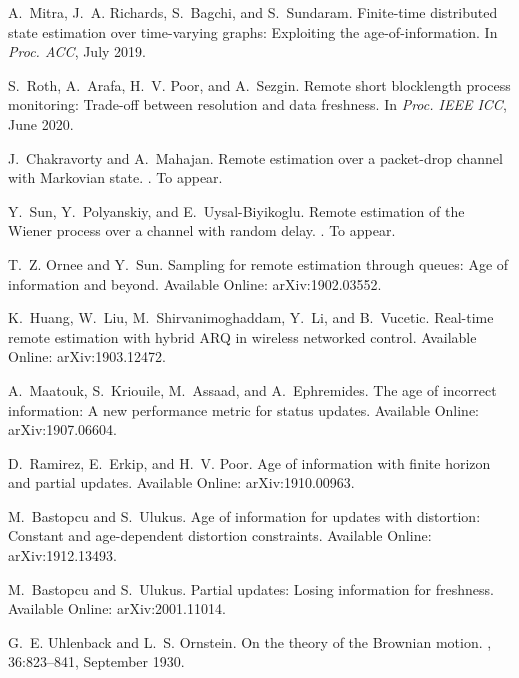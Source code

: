\documentclass[12pt,journal,onecolumn]{IEEEtran}
\begin{document}
\begin{thebibliography}{10}
A.~Mitra, J.~A. Richards, S.~Bagchi, and S.~Sundaram.
\newblock Finite-time distributed state estimation over time-varying graphs:
  Exploiting the age-of-information.
\newblock In {\em Proc. ACC}, July 2019.

S.~Roth, A.~Arafa, H.~V. Poor, and A.~Sezgin.
\newblock Remote short blocklength process monitoring: Trade-off between
  resolution and data freshness.
\newblock In {\em Proc. IEEE ICC}, June 2020.

J.~Chakravorty and A.~Mahajan.
\newblock Remote estimation over a packet-drop channel with {M}arkovian state.
.
\newblock To appear.

Y.~Sun, Y.~Polyanskiy, and E.~Uysal-Biyikoglu.
\newblock Remote estimation of the {W}iener process over a channel with random
  delay.
.
\newblock To appear.

T.~Z. Ornee and Y.~Sun.
\newblock Sampling for remote estimation through queues: Age of information and
  beyond.
\newblock Available Online: ar{X}iv:1902.03552.

K.~Huang, W.~Liu, M.~Shirvanimoghaddam, Y.~Li, and B.~Vucetic.
\newblock Real-time remote estimation with hybrid {ARQ} in wireless networked
  control.
\newblock Available Online: ar{X}iv:1903.12472.

A.~Maatouk, S.~Kriouile, M.~Assaad, and A.~Ephremides.
\newblock The age of incorrect information: A new performance metric for status
  updates.
\newblock Available Online: ar{X}iv:1907.06604.

D.~Ramirez, E.~Erkip, and H.~V. Poor.
\newblock Age of information with finite horizon and partial updates.
\newblock Available Online: arXiv:1910.00963.

M.~Bastopcu and S.~Ulukus.
\newblock Age of information for updates with distortion: Constant and
  age-dependent distortion constraints.
\newblock Available Online: ar{X}iv:1912.13493.

M.~Bastopcu and S.~Ulukus.
\newblock Partial updates: Losing information for freshness.
\newblock Available Online: ar{X}iv:2001.11014.

G.~E. Uhlenback and L.~S. Ornstein.
\newblock On the theory of the {B}rownian motion.
, 36:823--841, September 1930.


\end{thebibliography}
\end{document}
